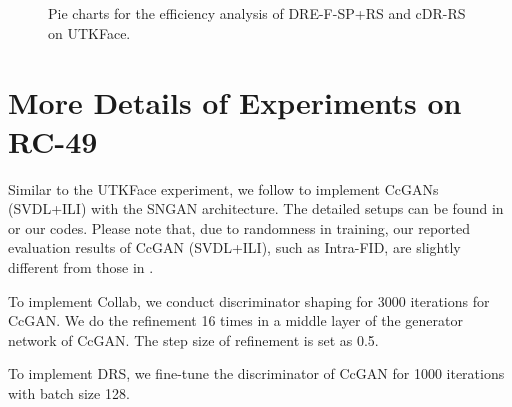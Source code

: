 \documentclass[final,12pt, 3p,times]{elsarticle}
\begin{document}
\begin{figure}[h]
	\centering
	\quad
	\\
	\quad
	\\
	\quad
	\caption{Pie charts for the efficiency analysis of DRE-F-SP+RS and cDR-RS on UTKFace.}
	\label{fig:UTKFace_efficiency_analysis_pie_charts}
\end{figure}







\section{More Details of Experiments on RC-49}\label{supp:details_of_rc49}

Similar to the UTKFace experiment, we follow \cite{ding2021ccgan, ding2020continuous} to implement CcGANs (SVDL+ILI) with the SNGAN architecture. The detailed setups can be found in \cite{ding2021ccgan, ding2020continuous} or our codes. Please note that, due to randomness in training, our reported evaluation results of CcGAN (SVDL+ILI), such as Intra-FID, are slightly different from those in \cite{ding2021ccgan, ding2020continuous}. 

To implement Collab, we conduct discriminator shaping for 3000 iterations for CcGAN. We do the refinement 16 times in a middle layer of the generator network of CcGAN. The step size of refinement is set as 0.5. 

To implement DRS, we fine-tune the discriminator of CcGAN for 1000 iterations with batch size 128.  
\end{document}
